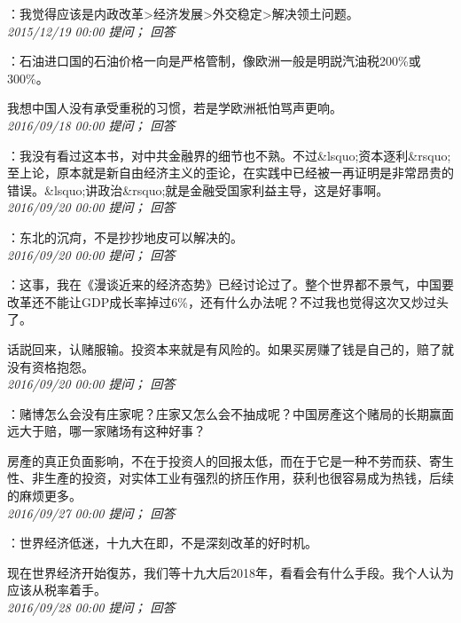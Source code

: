 \documentclass[twocolumn]{ctexart}
\begin{document}
：我觉得应该是内政改革>经济发展>外交稳定>解决领土问题。\\

\textit{\hfill\noindent\small 2015/12/19 00:00 提问； 回答}

：石油进口国的石油价格一向是严格管制，像欧洲一般是明説汽油税200\%或300\%。

我想中国人没有承受重税的习惯，若是学欧洲衹怕骂声更响。\\

\textit{\hfill\noindent\small 2016/09/18 00:00 提问； 回答}

：我没有看过这本书，对中共金融界的细节也不熟。不过\&lsquo;资本逐利\&rsquo;至上论，原本就是新自由经济主义的歪论，在实践中已经被一再证明是非常昂贵的错误。\&lsquo;讲政治\&rsquo;就是金融受国家利益主导，这是好事啊。\\

\textit{\hfill\noindent\small 2016/09/20 00:00 提问； 回答}

：东北的沉疴，不是抄抄地皮可以解决的。\\

\textit{\hfill\noindent\small 2016/09/20 00:00 提问； 回答}

：这事，我在《漫谈近来的经济态势》已经讨论过了。整个世界都不景气，中国要改革还不能让GDP成长率掉过6\%，还有什么办法呢？不过我也觉得这次又炒过头了。

话説回来，认赌服输。投资本来就是有风险的。如果买房赚了钱是自己的，赔了就没有资格抱怨。\\

\textit{\hfill\noindent\small 2016/09/20 00:00 提问； 回答}

：赌博怎么会没有庄家呢？庄家又怎么会不抽成呢？中国房產这个赌局的长期赢面远大于赔，哪一家赌场有这种好事？

房產的真正负面影响，不在于投资人的回报太低，而在于它是一种不劳而获、寄生性、非生產的投资，对实体工业有强烈的挤压作用，获利也很容易成为热钱，后续的麻烦更多。\\

\textit{\hfill\noindent\small 2016/09/27 00:00 提问； 回答}

：世界经济低迷，十九大在即，不是深刻改革的好时机。

现在世界经济开始復苏，我们等十九大后2018年，看看会有什么手段。我个人认为应该从税率着手。\\

\textit{\hfill\noindent\small 2016/09/28 00:00 提问； 回答}
\end{document}
